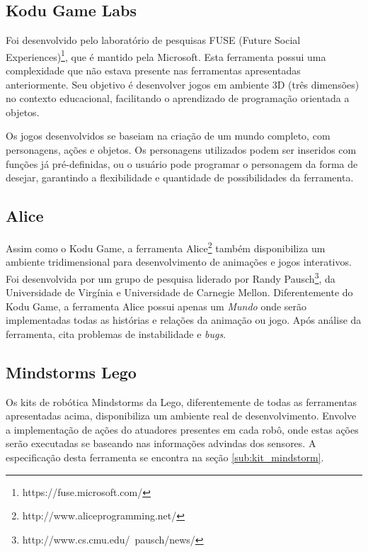 	\subsection{Kodu Game Labs} %
	\label{sub:kodu_game_labs}

		Foi desenvolvido pelo laboratório de pesquisas FUSE (Future Social Experiences)\footnote{https://fuse.microsoft.com/}, que é mantido pela Microsoft. Esta ferramenta possui uma complexidade que não estava presente nas ferramentas apresentadas anteriormente. Seu objetivo é desenvolver jogos em ambiente 3D (três dimensões) no contexto educacional, facilitando o aprendizado de programação orientada a objetos. 

		Os jogos desenvolvidos se baseiam na criação de um mundo completo, com personagens, ações e objetos. Os personagens utilizados podem ser inseridos com funções já pré-definidas, ou o usuário pode programar o personagem da forma de desejar, garantindo a flexibilidade e quantidade de possibilidades da ferramenta.
	

	\subsection{Alice} %
	\label{sub:alice}
		Assim como o Kodu Game, a ferramenta Alice\footnote{http://www.aliceprogramming.net/} também disponibiliza um ambiente tridimensional para desenvolvimento de animações e jogos interativos. Foi desenvolvida por um grupo de pesquisa liderado por Randy Pausch\footnote{http://www.cs.cmu.edu/~pausch/news/}, da Universidade de Virgínia e Universidade de Carnegie Mellon. Diferentemente do Kodu Game, a ferramenta Alice possui apenas um \textit{Mundo} onde serão implementadas todas as histórias e relações da animação ou jogo. Após análise da ferramenta, \cite{analiseFerramentaEnsinoComputacao} cita problemas de instabilidade e \textit{bugs}.
	

	\subsection{Mindstorms Lego} %
	\label{sub:mindstorm_lego}

		Os kits de robótica Mindstorms da Lego, diferentemente de todas as ferramentas apresentadas acima, disponibiliza um ambiente real de desenvolvimento. Envolve a implementação de ações do atuadores presentes em cada robô, onde estas ações serão executadas se baseando nas informações advindas dos sensores. A especificação desta ferramenta se encontra na seção \ref{sub:kit_mindstorm}.
	
